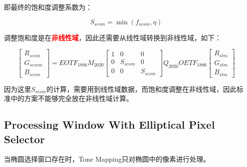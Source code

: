 \documentclass{article}
\begin{document}
即最终的饱和度调整系数为：

\begin{equation} S_{scsm} = \min(f_{scsm}, \eta) \end{equation}

调整饱和度是在\textbf{\textcolor{red}{非线性域}}，因此还需要从线性域转换到非线性域，如下：

\begin{equation}
\left[\begin{array}{c}R_{scsm}\\G_{scscm}\\B_{scsm}\end{array} \right] = EOTF_{1886} M_{2020} \left[ \begin{array}{ccc} 1 & 0 & 0 \\ 0 & S_{scsm} & 0 \\ 0 & 0 & S_{scsm} \end{array} \right] Q_{2020} OETF_{1886} \left[ \begin{array}{c} R_{stm}\\G_{stm}\\B_{stm} \end{array} \right]
\end{equation}

因为这里$S_{scsm}$的计算，需要用到线性域数据，而饱和度调整在非线性域，因此标准中的方案不能够完全放在非线性域计算。

\subsection{Processing Window With Elliptical Pixel Selector}

当椭圆选择窗口存在时，Tone Mapping只对椭圆中的像素进行处理。

\newpage


\end{document}
